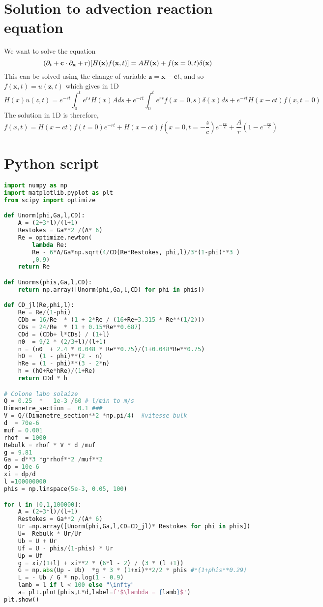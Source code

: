 \section{Solution to advection reaction equation}
\label{ap:kinetic_solved}

We want to solve the equation
\begin{equation}
    (\partial_t + \textbf{c}\cdot {\partial_\textbf{x}} + r)[H(\textbf{x}) f(\textbf{x},t)]= A H(\textbf{x}) + f(\textbf{x}=0,t)\delta(\textbf{x})
\end{equation}
This can be solved using the change of variable $\textbf{z}= \textbf{x}-\textbf{c}t$, and so $f(\textbf{x},t) = u(\textbf{z},t)$ which gives in 1D
\begin{equation}
H(x) u(z,t)
= 
e^{-rt}\int_0^t e^{rs} H(x) A ds
+ e^{-rt}\int_0^t e^{rs} f(x=0,s) \delta(x) ds
+ e^{-rt} H(x-ct) f(x,t=0)
\end{equation}
The solution in 1D is therefore,
\begin{equation}
    f(x,t) = H(x-ct) f(t=0) e^{-rt}
    + H(x-ct) f(x=0,t=-\frac{z}{c}) e^{-\frac{rx}{c}}+\frac{A}{r}(1-e^{-\frac{rx}{c}})
\end{equation}

\section{Python script}
\begin{lstlisting}[language=Python,backgroundcolor=\color{gray!10}]
import numpy as np
import matplotlib.pyplot as plt
from scipy import optimize

def Unorm(phi,Ga,l,CD):
    A = (2+3*l)/(l+1)
    Restokes = Ga**2 /(A* 6) 
    Re = optimize.newton(
        lambda Re:  
        Re - 6*A/Ga*np.sqrt(4/CD(Re*Restokes, phi,l)/3*(1-phi)**3 )  
        ,0.9)
    return Re

def Unorms(phis,Ga,l,CD):
    return np.array([Unorm(phi,Ga,l,CD) for phi in phis])

def CD_jl(Re,phi,l):
    Re = Re/(1-phi) 
    CDb = 16/Re  * (1 + 2*Re / (16+Re+3.315 * Re**(1/2))) 
    CDs = 24/Re  * (1 + 0.15*Re**0.687) 
    CDd = (CDb+ l*CDs) / (1+l)
    n0  = 9/2 * (2/3+l)/(l+1) 
    n = (n0  + 2.4 * 0.048 * Re**0.75)/(1+0.048*Re**0.75) 
    hO =  (1 - phi)**(2 - n)    
    hRe = (1 - phi)**(3 - 2*n)
    h = (hO+Re*hRe)/(1+Re)
    return CDd * h  

# Colone labo solaize 
Q = 0.25  *   1e-3 /60 # l/min to m/s
Dimanetre_section =  0.1 ###
V = Q/(Dimanetre_section**2 *np.pi/4)  #vitesse bulk 
d  = 70e-6
muf = 0.001
rhof  = 1000
Rebulk = rhof * V * d /muf
g = 9.81
Ga = d**3 *g*rhof**2 /muf**2
dp = 10e-6
xi = dp/d
l =100000000
phis = np.linspace(5e-3, 0.05, 100)

for l in [0,1,100000]:
    A = (2+3*l)/(l+1)
    Restokes = Ga**2 /(A* 6) 
    Ur =np.array([Unorm(phi,Ga,l,CD=CD_jl)* Restokes for phi in phis])
    U=  Rebulk * Ur/Ur
    Ub = U + Ur
    Uf = U - phis/(1-phis) * Ur
    Up = Uf
    g = xi/(1+l) + xi**2 * (6*l - 2) / (3 * (l +1))
    G = np.abs(Up - Ub)  *g * 3 * (1+xi)**2/2 * phis #*(1+phis**0.29)
    L = - Ub / G * np.log(1 - 0.9) 
    lamb = l if l < 100 else "\infty"
    a= plt.plot(phis,L*d,label=f'$\lambda = {lamb}$') 
plt.show()


\end{lstlisting}